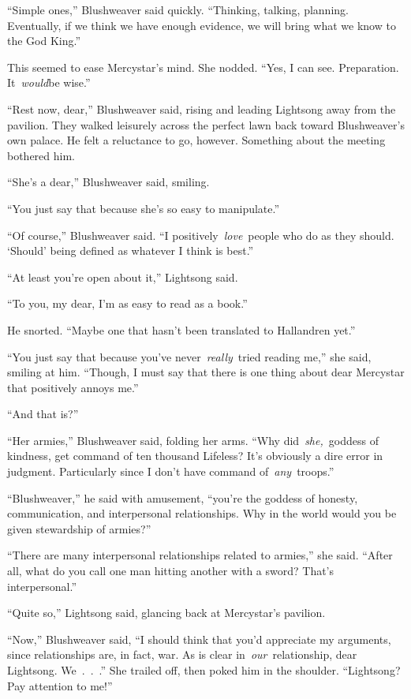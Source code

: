 “Simple ones,” Blushweaver said quickly. “Thinking, talking, planning. Eventually, if we think we have enough evidence, we will bring what we know to the God King.”

This seemed to ease Mercystar’s mind. She nodded. “Yes, I can see. Preparation. It~\textit{would}be wise.”

“Rest now, dear,” Blushweaver said, rising and leading Lightsong away from the pavilion. They walked leisurely across the perfect lawn back toward Blushweaver’s own palace. He felt a reluctance to go, however. Something about the meeting bothered him.

“She’s a dear,” Blushweaver said, smiling.

“You just say that because she’s so easy to manipulate.”

“Of course,” Blushweaver said. “I positively~\textit{love}~people who do as they should. ‘Should’ being defined as whatever I think is best.”

“At least you’re open about it,” Lightsong said.

“To you, my dear, I’m as easy to read as a book.”

He snorted. “Maybe one that hasn’t been translated to Hallandren yet.”

“You just say that because you’ve never~\textit{really}~tried reading me,” she said, smiling at him. “Though, I must say that there is one thing about dear Mercystar that positively annoys me.”

“And that is?”

“Her armies,” Blushweaver said, folding her arms. “Why did~\textit{she,}~goddess of kindness, get command of ten thousand Lifeless? It’s obviously a dire error in judgment. Particularly since I don’t have command of~\textit{any}~troops.”

“Blushweaver,” he said with amusement, “you’re the goddess of honesty, communication, and interpersonal relationships. Why in the world would you be given stewardship of armies?”

“There are many interpersonal relationships related to armies,” she said. “After all, what do you call one man hitting another with a sword? That’s interpersonal.”

“Quite so,” Lightsong said, glancing back at Mercystar’s pavilion.

“Now,” Blushweaver said, “I should think that you’d appreciate my arguments, since relationships are, in fact, war. As is clear in~\textit{our}~relationship, dear Lightsong. We~.~.~.” She trailed off, then poked him in the shoulder. “Lightsong? Pay attention to me!”


